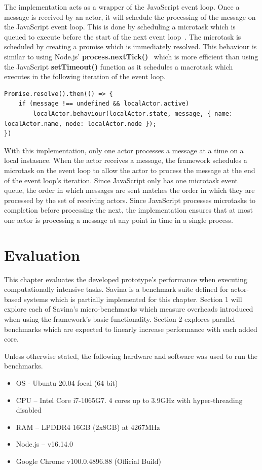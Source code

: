 \documentclass[12pt, a4paper]{report}
\theoremstyle{definition}
\theoremstyle{definition}%
\theoremstyle{definition}%
\theoremstyle{definition}%
\theoremstyle{definition}%
\theoremstyle{definition}%
\begin{document}
The implementation acts as a wrapper of the JavaScript event loop. Once a message is received by an actor, it will schedule the processing of the message on the JavaScript event loop. This is done by scheduling a microtask which is queued to execute before the start of the next event loop~\cite{eventloopbrowser}\cite{eventloopnode}. The microtask is scheduled by creating a promise which is immediately resolved. This behaviour is similar to using Node.js' \textbf{process.nextTick()}~\cite{nexttick} which is more efficient than using the JavaScript \textbf{setTimeout()} function as it schedules a macrotask which executes in the following iteration of the event loop.
\begin{lstlisting}
Promise.resolve().then(() => {
    if (message !== undefined && localActor.active)
        localActor.behaviour(localActor.state, message, { name: localActor.name, node: localActor.node });
})
\end{lstlisting}

With this implementation, only one actor processes a message at a time on a local instasnce. When the actor receives a message, the framework schedules a microtask on the event loop to allow the actor to process the message at the end of the event loop's iteration. Since JavaScript only has one microtask event queue, the order in which messages are sent matches the order in which they are processed by the set of receiving actors. Since JavaScript processes microtasks to completion before processing the next, the implementation ensures that at most one actor is processing a message at any point in time in a single process.
\chapter{Evaluation}
This chapter evaluates the developed prototype's performance when executing computationally intensive tasks. Savina is a benchmark suite defined for actor-based systems which is partially implemented for this chapter. Section 1 will explore each of Savina’s micro-benchmarks which measure overheads introduced when using the framework's basic functionality. Section 2 explores parallel benchmarks which are expected to linearly increase performance with each added core. 

Unless otherwise stated, the following hardware and software was used to run the benchmarks.
\begin{itemize}
    \item OS - Ubuntu 20.04 focal (64 bit)
    \item CPU – Intel Core i7-1065G7. 4 cores up to 3.9GHz with hyper-threading disabled
    \item RAM – LPDDR4 16GB (2x8GB) at 4267MHz
    \item Node.js – v16.14.0
    \item Google Chrome v100.0.4896.88 (Official Build)
\end{itemize}
\end{document}
